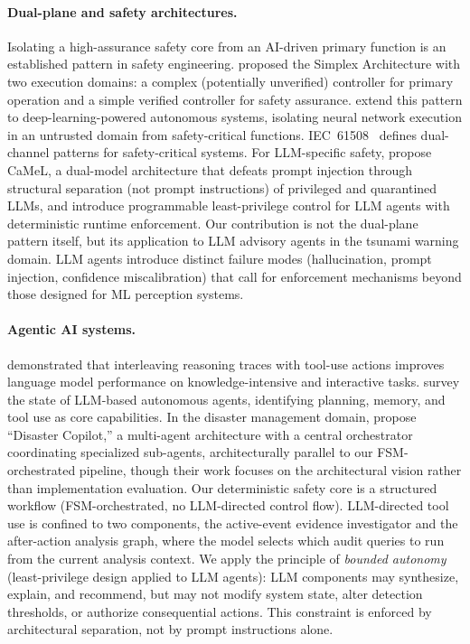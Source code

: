 \documentclass{article}
\begin{document}
\paragraph{Dual-plane and safety architectures.}
Isolating a high-assurance safety core from an AI-driven primary
function is an established pattern in safety engineering.
\citet{sha2001using} proposed the Simplex Architecture with two
execution domains: a complex (potentially unverified) controller for
primary operation and a simple verified controller for safety
assurance. \citet{nesti2025simplex} extend this pattern to
deep-learning-powered autonomous systems, isolating neural network
execution in an untrusted domain from safety-critical functions.
IEC~61508~\citep{iec61508} defines dual-channel patterns for
safety-critical systems. For LLM-specific safety,
\citet{debenedetti2025camel} propose CaMeL, a dual-model architecture
that defeats prompt injection through structural separation (not
prompt instructions) of privileged and quarantined LLMs, and
\citet{shi2025progent} introduce programmable least-privilege control
for LLM agents with deterministic runtime enforcement. Our
contribution is not the dual-plane pattern itself, but its application
to LLM advisory agents in the tsunami warning domain. LLM agents
introduce distinct failure modes (hallucination, prompt injection,
confidence miscalibration) that call for enforcement mechanisms beyond
those designed for ML perception systems.

\paragraph{Agentic AI systems.}
\citet{yao2023react} demonstrated that interleaving reasoning traces
with tool-use actions improves language model performance on
knowledge-intensive and interactive tasks. \citet{wang2024survey} survey the
state of LLM-based autonomous agents, identifying planning, memory, and
tool use as core capabilities. In the disaster management domain,
\citet{li2025disaster} propose ``Disaster Copilot,'' a multi-agent
architecture with a central orchestrator coordinating specialized
sub-agents, architecturally parallel to our FSM-orchestrated pipeline,
though their work focuses on the architectural vision rather than
implementation evaluation. Our deterministic safety core is a structured workflow
(FSM-orchestrated, no LLM-directed control flow).  LLM-directed tool
use is confined to two components, the active-event evidence
investigator and the after-action analysis graph, where the model
selects which audit queries to run from the current analysis
context. We apply the principle of \emph{bounded
autonomy} (least-privilege design applied to LLM agents):
LLM components may synthesize, explain,
and recommend, but may not modify system state, alter
detection thresholds, or authorize consequential actions.
This constraint is enforced by architectural separation,
not by prompt instructions alone.
\end{document}
